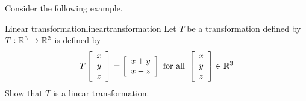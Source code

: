 Consider the following example.

\begin{example}{Linear transformation}{lineartransformation}
Let $T$ be a transformation defined by
$T:\mathbb{R}^3\to\mathbb{R}^2$ is defined by
\[
T\left[\begin{array}{c} x \\ y \\ z \end{array}\right]
= 
\left[\begin{array}{c} x+y \\ x-z \end{array}\right]
\mbox{ for all }
\left[\begin{array}{c} x \\ y \\ z \end{array}\right] \in\mathbb{R}^3
\]
Show that $T$ is a linear transformation.
\end{example}

